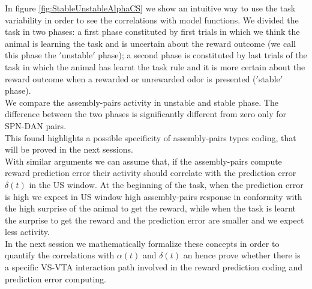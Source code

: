 In figure \ref{fig:StableUnstableAlphaCS} we show an intuitive way to use the task variability in order to see the correlations with model functions. We divided the task in two phases: a first phase constituted by first trials in which we think the animal is learning the task and is uncertain about the reward outcome (we call this phase the $'$unstable$'$ phase); a second phase is constituted by last trials of the task in which the animal has learnt the task rule and it is more certain about the reward outcome when a rewarded or unrewarded odor is presented ($'$stable$'$ phase).\\We compare the assembly-pairs activity in unstable and stable phase. The difference between the two phases is significantly different from zero only for SPN-DAN pairs.\\This found highlights a possible specificity of assembly-pairs types coding, that will be proved in the next sessions.\\With similar arguments we can assume that, if the assembly-pairs compute reward prediction error their activity should correlate with the prediction error $\delta(t)$ in the US window. At the beginning of the task, when the prediction error is high we expect in US window high assembly-pairs response in conformity with the high surprise of the animal to get the reward, while when the task is learnt the surprise to get the reward and the prediction error are smaller and we expect less activity.\\In the next session we mathematically formalize these concepts in order to quantify the correlations with $\alpha(t)$ and $\delta(t)$ an hence prove whether there is a specific VS-VTA interaction path involved in the reward prediction coding and prediction error computing. 
